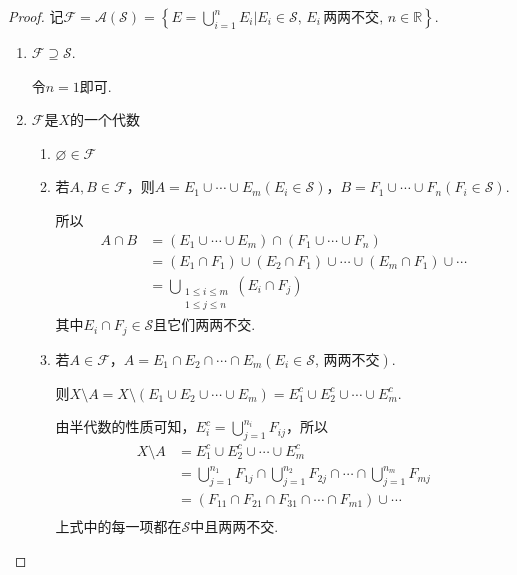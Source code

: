 \begin{proof}
    记$\mathcal{F}=\mathcal{A}(\mathcal{S})=\left\{E=\bigcup_{i=1}^n{E_i}\bigg| E_i\in\mathcal{S},\,E_i\,\text{两两不交},\,n\in\mathbb{R} \right\}$.\par
    \begin{enumerate}[label=(\arabic*)]
        \item $\mathcal{F}\supseteq\mathcal{S}$.\par
        令$n=1$即可.
        \item $\mathcal{F}$是$X$的一个代数
        \begin{enumerate}[label=(\roman*)]
            \item $\varnothing\in\mathcal{F}$
            \item 若$A,B\in\mathcal{F}$，则$A=E_1\cup\cdots\cup E_m(E_i\in\mathcal{S})$，$B=F_1\cup\cdots\cup F_n (F_i\in\mathcal{S})$.\par
            所以
            {\setlength{\jot}{-2pt}\begin{align*}
                A\cap B&=(E_1\cup\cdots\cup E_m)\cap(F_1\cup\cdots\cup F_n)\\
                &=(E_1\cap F_1)\cup(E_2\cap F_1)\cup\cdots\cup (E_m\cap F_1)\cup\cdots\\
                &=\bigcup_{\substack{1\leqslant i\leqslant m\\ 1\leqslant j\leqslant n}}(E_i\cap F_j)
            \end{align*}}
            其中$E_i\cap F_j\in\mathcal{S}$且它们两两不交.
            \item 若$A\in\mathcal{F}$，$A=E_1\cap E_2\cap\cdots\cap E_m(E_i\in\mathcal{S},\,\text{两两不交})$.\par
            则$X\setminus A = X\setminus (E_1\cup E_2\cup\cdots\cup E_m)=E_1^c\cup E_2^c\cup\cdots\cup E_m^c$.\par
            由半代数的性质可知，$E_i^c=\bigcup_{j=1}^{n_i}{F_{ij}}$，所以
            {\setlength{\jot}{-2pt}\setlength\belowdisplayskip{-10pt}\begin{align*}
                X\setminus A&=E_1^c\cup E_2^c\cup\cdots\cup E_m^c\\
                &=\bigcup_{j=1}^{n_1}{F_{1j}}\cap\bigcup_{j=1}^{n_2}{F_{2j}}\cap\cdots\cap\bigcup_{j=1}^{n_m}{F_{mj}} \\
                &=(F_{11}\cap F_{21}\cap F_{31}\cap\cdots\cap F_{m1})\cup\cdots \\
            \end{align*}}
            上式中的每一项都在$\mathcal{S}$中且两两不交.

\end{enumerate}
\end{enumerate}
\end{proof}
